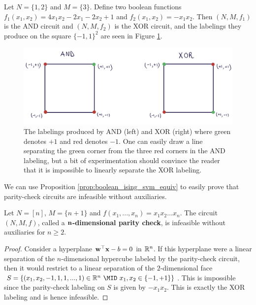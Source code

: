 \documentclass{article}
\begin{document}
\begin{example}\label{ex:AND_XOR_linear_separability}
  Let $N = \{1,2\}$ and $M = \{3\}$. Define two boolean functions $f_1(x_1,x_2) = 4x_1x_2 - 2x_1 - 2x_2 + 1$ and $f_2(x_1,x_2) = -x_1x_2$. Then $(N,M,f_1)$ is the AND circuit and $(N,M,f_2)$ is the XOR circuit, and the labelings they produce on the square $\{-1,1\}^2$ are seen in Figure \ref{fig:AND_XOR_lin_sep}.
  \begin{center}
  \begin{figure}[h]
    \includegraphics[width=0.95\linewidth]{images/AND_XOR_labeling.jpeg}
    \caption{The labelings produced by AND (left) and XOR (right) where green denotes $+1$ and red denotes $-1$. One can easily draw a line separating the green corner from the three red corners in the AND labeling, but a bit of experimentation should convince the reader that it is impossible to linearly separate the XOR labeling.}
    \label{fig:AND_XOR_lin_sep}
  \end{figure}
  \end{center}
\end{example}

We can use Proposition \ref{prop:boolean_ising_svm_equiv} to easily prove that parity-check circuits are infeasible without auxiliaries.

\begin{prop}\label{prop:parity_checks_are_infeasible}
  Let $N = [n]$, $M = \{n+1\}$ and $f(x_1,...,x_n) = x_1x_2\ldots x_n$. The circuit $(N,M,f)$, called a \textbf{$\mathbf{n}$-dimensional parity check}, is infeasible without auxiliaries for $n \geq 2$.
\end{prop}
\begin{proof}
  Consider a hyperplane $\mathbf{w}^\top\mathbf{x} - b = 0$ in $\mathbb{R}^n$. If this hyperplane were a linear separation of the $n$-dimensional hypercube labeled by the parity-check circuit, then it would restrict to a linear separation of the $2$-dimensional face $S = \{(x_1,x_2,-1,1,1,...,1) \in \bR^n ~\mid~ x_1,x_2 \in \{-1,+1\}\}$. This is impossible since the parity-check labeling on $S$ is given by $-x_1x_2$. This is exactly the XOR labeling and is hence infeasible.
\end{proof}
\end{document}
